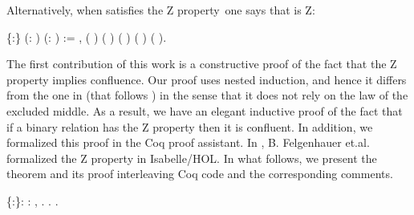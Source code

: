 Alternatively, when  satisfies the Z property\ one says that  is Z: \begin{coqdoccode}
\coqdocemptyline
\coqdocnoindent
{}  \{:\} (:  ) (:   ) := \coqdockw{\ensuremath{\forall}}  ,     ( )   ( )  ( ) ( ) ( ).\coqdoceol
\coqdocemptyline
\end{coqdoccode}
The first contribution of this work is a constructive proof of the
    fact that the Z property implies confluence. Our proof uses nested
    induction, and hence it differs from the one in \cite{kes09}
    (that follows \cite{ZPropertyDraft}) in the sense that it does
    not rely on the law of the excluded middle. As a result, we have
    an elegant inductive proof of the fact that if a binary relation
    has the Z property then it is confluent. In addition, we
    formalized this proof in the Coq proof assistant. In
    \cite{zproperty}, B. Felgenhauer et.al. formalized the Z
    property in Isabelle/HOL. In what follows, we present the theorem
    and its proof interleaving Coq code and the corresponding
    comments. \begin{coqdoccode}
\coqdocemptyline
\coqdocnoindent
{}  \{:\}: \coqdockw{\ensuremath{\forall}} :  ,     .\coqdoceol
\coqdocnoindent
{}.\coqdoceol
\coqdocindent{1.00em}
  . \end{coqdoccode}
